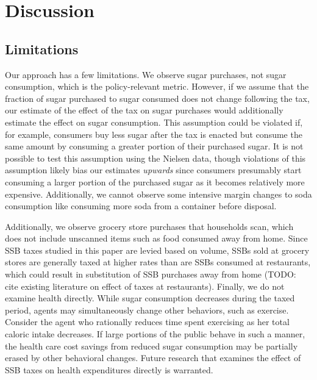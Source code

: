 \documentclass[12pt]{article}
\begin{document}


\section{Discussion} \label{discussion}



\subsection{Limitations}

Our approach has a few limitations. We observe sugar purchases, not sugar consumption, which is the policy-relevant metric. However, if we assume that the fraction of sugar purchased to sugar consumed does not change following the tax, our estimate of the effect of the tax on sugar purchases would additionally estimate the effect on sugar consumption. This assumption could be violated if, for example, consumers buy less sugar after the tax is enacted but consume the same amount by consuming a greater portion of their purchased sugar. It is not possible to test this assumption using the Nielsen data, though violations of this assumption likely bias our estimates \textit{upwards} since consumers presumably start consuming a larger portion of the purchased sugar as it becomes relatively more expensive. Additionally, we cannot observe some intensive margin changes to soda consumption like consuming more soda from a container before disposal.

Additionally, we observe grocery store purchases that households scan, which does not include unscanned items such as food consumed away from home. Since SSB taxes studied in this paper are levied based on volume, SSBs sold at grocery stores are generally taxed at higher rates than are SSBs consumed at restaurants, which could result in substitution of SSB purchases away from home (TODO: cite existing literature on effect of taxes at restaurants). Finally, we do not examine health directly. While sugar consumption decreases during the taxed period, agents may simultaneously change other behaviors, such as exercise. Consider the agent who rationally reduces time spent exercising as her total caloric intake decreases. If large portions of the public behave in such a manner, the health care cost savings from reduced sugar consumption may be partially erased by other behavioral changes. Future research that examines the effect of SSB taxes on health expenditures directly is warranted.
\end{document}
